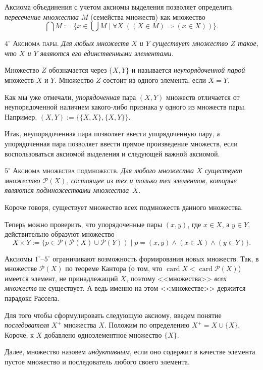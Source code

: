 Аксиома объединения с учетом аксиомы выделения позволяет определить
\textit{пересечение множества $M$} (семейства множеств) как множество
\[
  \bigcap M := \{x \in \bigcup M \mid \forall X\; ((X \in M) \Rightarrow (x \in X))\}.
\]

$4^\circ$ \textsc{Аксиома пары}. \textit{Для любых множеств $X$ и $Y$ существует множество $Z$ такое,
что $X$ и $Y$ являются его единственными элементами.}

Множество $Z$ обозначается через $\{X, Y\}$ и называется \textit{неупорядоченной парой} множеств $X$ и $Y$. Множество $Z$ состоит из одного элемента, если $X = Y$.

Как мы уже отмечали, \textit{упорядоченная} пара $(X, Y)$ множеств отличается от
неупорядоченной наличием какого-либо признака у одного из множеств пары. Например,
$(X, Y) := \{\{X, X\}, \{X, Y\}\}$.

Итак, неупорядоченная пара позволяет ввести упорядоченную пару, а
упорядоченная пара позволяет ввести прямое произведение множеств, если
воспользоваться аксиомой выделения и следующей важной аксиомой.

$5^\circ$ \textsc{Аксиома множества подмножеств}. \textit{Для любого множества $X$ существует множество $\mathscr{P}(X)$, состоящее из тех и только тех элементов, которые являются
подмножествами множества~$X$.}

Короче говоря, существует множество всех подмножеств данного множества.

Теперь можно проверить, что упорядоченные пары $(x, y)$, где $x \in X$, а $y \in Y$,
действительно образуют множество
\[
  X \times Y := \{p \in \mathscr{P}(\mathscr{P}(X) \cup \mathscr{P}(Y)) \mid p = (x, y) \land (x \in X) \land (y \in Y)\}.
\]

Аксиомы $1^\circ$--$5^\circ$ ограничивают возможность формирования новых множеств. Так,
в множестве $\mathscr{P}(X)$ по теореме Кантора (о том, что $\operatorname{card} X < \operatorname{card} \mathscr{P}(X)$) имеется
элемент, не принадлежащий $X$, поэтому <<множества>> \textit{всех множеств} не существует.
А ведь именно на этом <<множестве>> держится парадокс Рассела.

Для того чтобы сформулировать следующую аксиому, введем понятие
\textit{последователя} $X^+$ множества $X$. Положим по определению $X^+ = X \cup \{X\}$. Короче,
к $X$ добавлено одноэлементное множество $\{X\}$.

Далее, множество назовем \textit{индуктивным}, если оно содержит в качестве элемента
пустое множество и последователь любого своего элемента.


